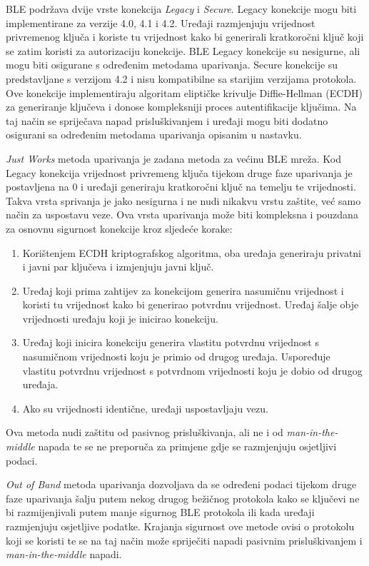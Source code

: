 \documentclass[times, utf8, diplomski]{fer}
\begin{document}
BLE podržava dvije vrste konekcija \emph{Legacy} i \emph{Secure}. Legacy konekcije mogu biti implementirane za verzije 4.0, 4.1 i 4.2. Uređaji razmjenjuju vrijednost privremenog ključa  i koriste tu vrijednost kako bi generirali kratkoročni ključ  koji se zatim koristi za autorizaciju konekcije. BLE Legacy konekcije su nesigurne, ali mogu biti osigurane s određenim metodama uparivanja. Secure konekcije su predstavljane s verzijom 4.2 i nisu kompatibilne sa starijim verzijama protokola. Ove konekcije implementiraju algoritam eliptičke krivulje Diffie-Hellman (ECDH) za generiranje ključeva i donose kompleksniji proces autentifikacije ključima. Na taj način se spriječava napad prisluškivanjem i uređaji mogu biti dodatno osigurani sa određenim metodama uparivanja opisanim u nastavku.

\emph{Just Works} metoda uparivanja je zadana metoda za većinu BLE mreža. Kod Legacy konekcija vrijednost privremeng ključa tijekom druge faze uparivanja je postavljena na 0 i uređaji generiraju kratkoročni ključ na temelju te vrijednosti. Takva vrsta sprivanja je jako nesigurna i ne nudi nikakvu vrstu zaštite, već samo način za uspostavu veze. Ova vrsta uparivanja može biti kompleksna i pouzdana za osnovnu sigurnost konekcije kroz sljedeće korake:
\begin{enumerate}
    \item Korištenjem ECDH kriptografskog algoritma, oba uređaja generiraju privatni i javni par ključeva i izmjenjuju javni ključ.
    \item Uređaj koji prima zahtijev za konekcijom generira nasumičnu vrijednost i koristi tu vrijednost kako bi generirao potvrdnu vrijednost. Uređaj šalje obje vrijednosti uređaju koji je inicirao konekciju.
    \item Uređaj koji inicira konekciju generira vlastitu potvrdnu vrijednost s nasumičnom vrijednosti koju je primio od drugog uređaja. Uspoređuje vlastitu potvrdnu vrijednost s potvrdnom vrijednosti koju je dobio od drugog uređaja.
    \item Ako su vrijednosti identične, uređaji uspostavljaju vezu.
\end{enumerate}
Ova metoda nudi zaštitu od pasivnog prisluškivanja, ali ne i od \emph{man-in-the-middle} napada te se ne preporuča za primjene gdje se razmjenjuju osjetljivi podaci. 

\emph{Out of Band} metoda uparivanja dozvoljava da se određeni podaci tijekom druge faze uparivanja šalju putem nekog drugog bežičnog protokola kako se ključevi ne bi razmijenjivali putem manje sigurnog BLE protokola ili kada uređaji razmjenjuju osjetljive podatke. Krajanja sigurnost ove metode ovisi o protokolu koji se koristi te se na taj način može spriječiti napadi pasivnim prisluškivanjem i \emph{man-in-the-middle} napadi.
\end{document}
